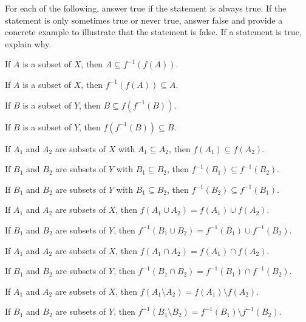 \item For each of the following, answer true if the statement is always true. If the statement is only sometimes true or never true, answer false and provide a concrete example to illustrate that the statement is false. If a statement is true, explain why. 
	\ba
	\item If $A$ is a subset of $X$, then $A \subseteq f^{-1}(f(A))$.
	
	\item If $A$ is a subset of $X$, then $f^{-1}(f(A)) \subseteq A$.

	\item  If $B$ is a subset of $Y$, then $B \subseteq f(f^{-1}(B))$.
	
	\item If $B$ is a subset of $Y$, then $f(f^{-1}(B)) \subseteq B$.

	\item If $A_1$ and $A_2$ are subsets of $X$ with $A_1 \subseteq A_2$, then $f(A_1) \subseteq f(A_2)$.
		
	\item If $B_1$ and $B_2$ are subsets of $Y$ with $B_1 \subseteq B_2$, then $f^{-1}(B_1) \subseteq f^{-1}(B_2)$.
	
	\item If $B_1$ and $B_2$ are subsets of $Y$ with $B_1 \subseteq B_2$, then $f^{-1}(B_2) \subseteq f^{-1}(B_1)$.
	
	\item If $A_1$ and $A_2$ are subsets of $X$, then $f(A_1 \cup A_2) = f(A_1) \cup f(A_2)$.
	
	\item If $B_1$ and $B_2$ are subsets of $Y$, then $f^{-1}(B_1 \cup B_2) = f^{-1}(B_1) \cup f^{-1}(B_2)$.	
	
	\item If $A_1$ and $A_2$ are subsets of $X$, then $f(A_1 \cap A_2) = f(A_1) \cap f(A_2)$.
	
	\item If $B_1$ and $B_2$ are subsets of $Y$, then $f^{-1}(B_1 \cap B_2) = f^{-1}(B_1) \cap f^{-1}(B_2)$.	
	
	\item If $A_1$ and $A_2$ are subsets of $X$, then $f(A_1 \setminus A_2) = f(A_1) \setminus f(A_2)$.

	\item If $B_1$ and $B_2$ are subsets of $Y$, then $f^{-1}(B_1 \setminus B_2) = f^{-1}(B_1) \setminus f^{-1}(B_2)$.	

	\ea


